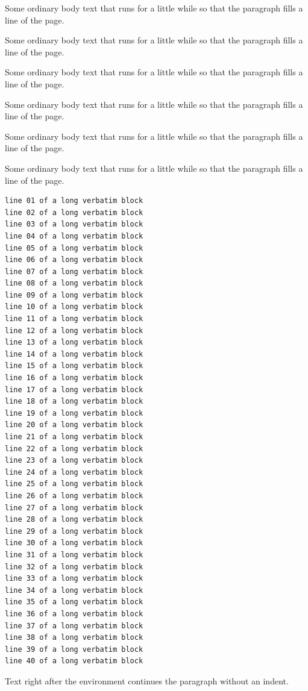 \documentclass{article}
\begin{document}
Some ordinary body text that runs for a little while so that the paragraph fills a line of the page.

Some ordinary body text that runs for a little while so that the paragraph fills a line of the page.

Some ordinary body text that runs for a little while so that the paragraph fills a line of the page.

Some ordinary body text that runs for a little while so that the paragraph fills a line of the page.

Some ordinary body text that runs for a little while so that the paragraph fills a line of the page.

Some ordinary body text that runs for a little while so that the paragraph fills a line of the page.
\begin{verbatim}
line 01 of a long verbatim block
line 02 of a long verbatim block
line 03 of a long verbatim block
line 04 of a long verbatim block
line 05 of a long verbatim block
line 06 of a long verbatim block
line 07 of a long verbatim block
line 08 of a long verbatim block
line 09 of a long verbatim block
line 10 of a long verbatim block
line 11 of a long verbatim block
line 12 of a long verbatim block
line 13 of a long verbatim block
line 14 of a long verbatim block
line 15 of a long verbatim block
line 16 of a long verbatim block
line 17 of a long verbatim block
line 18 of a long verbatim block
line 19 of a long verbatim block
line 20 of a long verbatim block
line 21 of a long verbatim block
line 22 of a long verbatim block
line 23 of a long verbatim block
line 24 of a long verbatim block
line 25 of a long verbatim block
line 26 of a long verbatim block
line 27 of a long verbatim block
line 28 of a long verbatim block
line 29 of a long verbatim block
line 30 of a long verbatim block
line 31 of a long verbatim block
line 32 of a long verbatim block
line 33 of a long verbatim block
line 34 of a long verbatim block
line 35 of a long verbatim block
line 36 of a long verbatim block
line 37 of a long verbatim block
line 38 of a long verbatim block
line 39 of a long verbatim block
line 40 of a long verbatim block
\end{verbatim}
Text right after the environment continues the paragraph without an indent.
\end{document}
